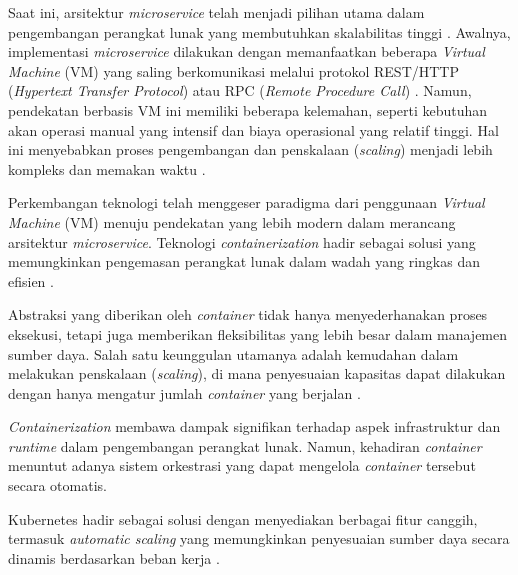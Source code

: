 Saat ini, arsitektur \textit{microservice} telah menjadi pilihan utama dalam pengembangan perangkat lunak yang membutuhkan skalabilitas tinggi \cite{Wu2014}. Awalnya, implementasi \textit{microservice} dilakukan dengan memanfaatkan beberapa \textit{Virtual Machine} (VM) yang saling berkomunikasi melalui protokol REST/HTTP (\textit{Hypertext Transfer Protocol}) atau RPC (\textit{Remote Procedure Call}) \cite{Khazaei2016}. Namun, pendekatan berbasis VM ini memiliki beberapa kelemahan, seperti kebutuhan akan operasi manual yang intensif dan biaya operasional yang relatif tinggi. Hal ini menyebabkan proses pengembangan dan penskalaan (\textit{scaling}) menjadi lebih kompleks dan memakan waktu \cite{Khazaei2016}.
\par
Perkembangan teknologi telah menggeser paradigma dari penggunaan \textit{Virtual Machine} (VM) menuju pendekatan yang lebih modern dalam merancang arsitektur \textit{microservice}. Teknologi \textit{containerization} hadir sebagai solusi yang memungkinkan pengemasan perangkat lunak dalam wadah yang ringkas dan efisien \cite{Khazaei2016}.
\par
Abstraksi yang diberikan oleh \textit{container} tidak hanya menyederhanakan proses eksekusi, tetapi juga memberikan fleksibilitas yang lebih besar dalam manajemen sumber daya. Salah satu keunggulan utamanya adalah kemudahan dalam melakukan penskalaan (\textit{scaling}), di mana penyesuaian kapasitas dapat dilakukan dengan hanya mengatur jumlah \textit{container} yang berjalan \cite{Singh2017}.
\par
\textit{Containerization} \cite{davidbritch} membawa dampak signifikan terhadap aspek infrastruktur dan \textit{runtime} dalam pengembangan perangkat lunak. Namun, kehadiran \textit{container} menuntut adanya sistem orkestrasi yang dapat mengelola \textit{container} tersebut secara otomatis.

Kubernetes hadir sebagai solusi dengan menyediakan berbagai fitur canggih, termasuk \textit{automatic scaling} yang memungkinkan penyesuaian sumber daya secara dinamis berdasarkan beban kerja \cite{Leila2018, kubernetes_2021}.

